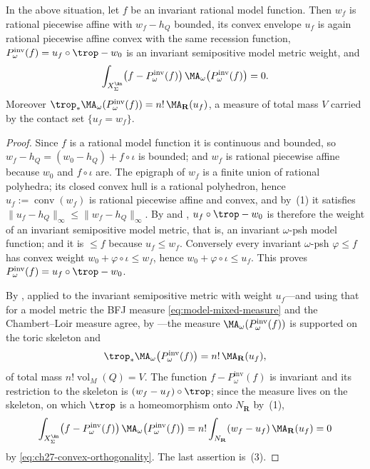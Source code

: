 \begin{theorem}
\label{thm:ch27-toric-orthogonality}
In the above situation, let $f$ be an invariant rational model function.  Then
$w_f$ is rational piecewise affine with $w_f-h_Q$ bounded, its convex
envelope $u_f$ is again rational piecewise affine convex with the same
recession function, $P^{\mathrm{inv}}_\omega(f)=u_f\circ\trop-w_0$ is an invariant
semipositive model metric weight, and
\begin{equation}\label{eq:ch27-toric-orthogonality}
 \int_{X_\Sigma^{\An}}
   \bigl(f-P^{\mathrm{inv}}_\omega(f)\bigr)\,
   \MA_\omega\bigl(P^{\mathrm{inv}}_\omega(f)\bigr)=0 .
\end{equation}
Moreover
$\trop_*\MA_\omega(P^{\mathrm{inv}}_\omega(f))=n!\,\MA_{\mathbf R}(u_f)$, a
measure of total mass $V$ carried by the contact set
$\{u_f=w_f\}$.
\end{theorem}

\begin{proof}
Since $f$ is a rational model function it is continuous and bounded, so
$w_f-h_Q=(w_0-h_Q)+f\circ\iota$ is bounded; and $w_f$ is rational
piecewise affine because $w_0$ and $f\circ\iota$ are.  The epigraph of
$w_f$ is a finite union of rational polyhedra; its closed convex hull is a
rational polyhedron, hence $u_f:=\operatorname{conv}(w_f)$
is rational piecewise affine and convex, and by
\,(1) it satisfies
$\lVert u_f-h_Q\rVert_\infty\leq\lVert w_f-h_Q\rVert_\infty$.  By
 and ,
$u_f\circ\trop-w_0$ is therefore the weight of an invariant semipositive
model metric, that is, an invariant $\omega$-psh model function; and it is
$\leq f$ because $u_f\leq w_f$.  Conversely every invariant
$\omega$-psh $\varphi\leq f$ has convex weight $w_0+\varphi\circ\iota
\leq w_f$, hence $w_0+\varphi\circ\iota\leq u_f$.  This proves
$P^{\mathrm{inv}}_\omega(f)=u_f\circ\trop-w_0$.

By , applied to the invariant semipositive metric
with weight $u_f$---and using that for a model metric the BFJ measure
\eqref{eq:model-mixed-measure} and the Chambert--Loir measure agree, by
---the measure
$\MA_\omega(P^{\mathrm{inv}}_\omega(f))$ is supported on the toric skeleton and
\[
 \trop_*\MA_\omega\bigl(P^{\mathrm{inv}}_\omega(f)\bigr)=n!\,\MA_{\mathbf R}(u_f),
\]
of total mass $n!\operatorname{vol}_M(Q)=V$.  The function
$f-P^{\mathrm{inv}}_\omega(f)$ is invariant and its restriction to the skeleton is
$(w_f-u_f)\circ\trop$; since the measure lives on the skeleton, on which
$\trop$ is a homeomorphism onto $N_{\mathbf R}$ by
\,(1),
\[
 \int_{X_\Sigma^{\An}}\bigl(f-P^{\mathrm{inv}}_\omega(f)\bigr)\,
   \MA_\omega\bigl(P^{\mathrm{inv}}_\omega(f)\bigr)
 =n!\int_{N_{\mathbf R}}(w_f-u_f)\,\MA_{\mathbf R}(u_f)=0
\]
by \eqref{eq:ch27-convex-orthogonality}.  The last assertion is
\,(3).
\end{proof}

